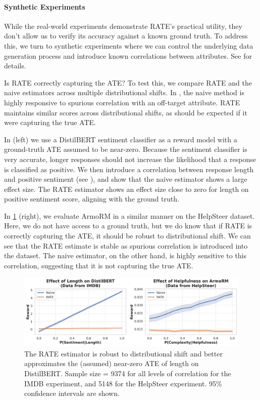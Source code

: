\documentclass{article}
\begin{document}
\paragraph{Synthetic Experiments}
\label{sec:synthetic}
While the real-world experiments demonstrate RATE's practical utility, they don't allow us to verify its accuracy against a known ground truth. To address this, we turn to synthetic experiments where we can control the underlying data generation process and introduce known correlations between attributes. See  for details.

Is RATE correctly capturing the ATE? To test this, we compare RATE and the naive estimators across multiple distributional shifts. In , the naive method is highly responsive to spurious correlation with an off-target attribute. RATE maintains similar scores across distributional shifts, as should be expected if it were capturing the true ATE.

In  (left) we use a DistilBERT sentiment classifier \citep{socher-etal-2013-recursive, sanh2020distilbertdistilledversionbert} as a reward model with a ground-truth ATE assumed to be near-zero. Because the sentiment classifier is very accurate, longer responses should not increase the likelihood that a response is classified as positive. We then introduce a correlation between response length and positive sentiment (see ), and show that the naive estimator shows a large effect size. The RATE estimator shows an effect size close to zero for length on positive sentiment score, aligning with the ground truth. 

In \cref{fig:synthetic_combo} (right), we evaluate ArmoRM \citep{ArmoRM} in a similar manner on the HelpSteer dataset. Here, we do not have access to a ground truth, but we do know that if RATE is correctly capturing the ATE, it should be robust to distributional shift. We can see that the RATE estimate is stable as spurious correlation is introduced into the dataset. The naive estimator, on the other hand, is highly sensitive to this correlation, suggesting that it is not capturing the true ATE.

\begin{figure}[t]
  \centering
  \includegraphics[width=\linewidth]{figures/synthetic_combo.png}
  \caption{The RATE estimator is robust to distributional shift and better approximates the (assumed) near-zero ATE of length on DistilBERT. Sample size = 9374 for all levels of correlation for the IMDB experiment, and 5148 for the HelpSteer experiment. 95\% confidence intervals are shown.}
  \label{fig:synthetic_combo}
\end{figure}
  
\end{document}

